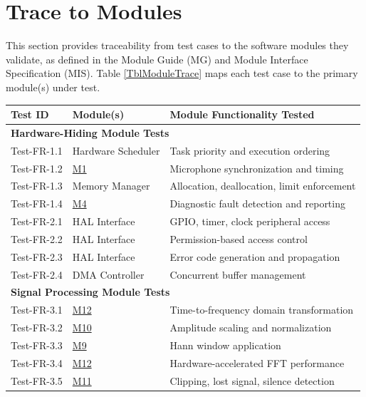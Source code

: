 \documentclass[12pt, titlepage]{article}
\begin{document}
\section{Trace to Modules}

This section provides traceability from test cases to the software modules they
validate, as defined in the Module Guide (MG) and Module Interface Specification
(MIS). Table \ref{TblModuleTrace} maps each test case to the primary module(s)
under test.

{\small
\begin{longtable}{|p{2.5cm}|p{3cm}|p{8cm}|}
\hline
\textbf{Test ID} & \textbf{Module(s)} & \textbf{Module Functionality Tested} \\
\hline
\hline
\multicolumn{3}{|l|}{\textbf{Hardware-Hiding Module Tests}} \\
\hline
Test-FR-1.1 & Hardware Scheduler & Task priority and execution ordering \\
\hline
Test-FR-1.2 & \hyperref[MG-mMicInput]{M1} & Microphone synchronization and
timing \\
\hline
Test-FR-1.3 & Memory Manager & Allocation, deallocation, limit enforcement \\
\hline
Test-FR-1.4 & \hyperref[MG-mMicDiag]{M4} & Diagnostic fault detection and
reporting \\
\hline
Test-FR-2.1 & HAL Interface & GPIO, timer, clock peripheral access \\
\hline
Test-FR-2.2 & HAL Interface & Permission-based access control \\
\hline
Test-FR-2.3 & HAL Interface & Error code generation and propagation \\
\hline
Test-FR-2.4 & DMA Controller & Concurrent buffer management \\
\hline
\hline
\multicolumn{3}{|l|}{\textbf{Signal Processing Module Tests}} \\
\hline
Test-FR-3.1 & \hyperref[MG-mFFT]{M12} & Time-to-frequency domain transformation
\\
\hline
Test-FR-3.2 & \hyperref[MG-mAudioNormalizer]{M10} & Amplitude scaling and
normalization \\
\hline
Test-FR-3.3 & \hyperref[MG-mAudioSpectralLeakage]{M9} & Hann window application
\\
\hline
Test-FR-3.4 & \hyperref[MG-mFFT]{M12} & Hardware-accelerated FFT performance \\
\hline
Test-FR-3.5 & \hyperref[MG-mAudioAnomaly]{M11} & Clipping, lost signal, silence
detection \\

\end{longtable}}
\end{document}
